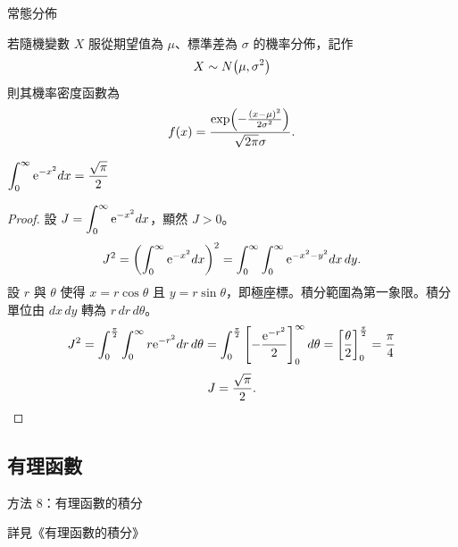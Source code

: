 \documentclass{beamer}
\newcommand{\Left} {\mathopen{}\mathclose\bgroup\left}
\newcommand{\Right}{\aftergroup\egroup\right}
\newcommand{\e}{\textup e}
\newcommand{\erf} {\operatorname{erf}}
\newcommand{\negskip}{\vskip -2em plus 3pt minus 3pt}
\theoremstyle{remark}
\begin{document}
\begin{frame}{常態分佈}
  \begin{definition}
    若隨機變數 $X$ 服從期望值為 $\mu$、標準差為 $\sigma$ 的機率分佈，記作
    \[X \sim N \Left( \mu, \sigma^2 \Right)\]
    則其機率密度函數為
    \[f(x) = \frac{\exp \Left( -\frac{\left( x - \mu \right)^2}{2\sigma^2} \Right)}{\sqrt{2\pi} \sigma}.\]
  \end{definition}
\end{frame}


\begin{frame}{$\displaystyle \int_0^\infty \e^{-x^2} dx = \frac{\sqrt\pi}{2}$}
  \begin{proof}
    設 $\displaystyle J = \int_0^\infty \e^{-x^2} dx$，顯然 $J > 0$。
    \[J^2 = \left( \int_0^\infty \e^{-x^2} dx \right)^2 = \int_0^\infty \int_0^\infty \e^{-x^2-y^2} dx\,dy.\]
    設 $r$ 與 $\theta$ 使得 $x = r\cos\theta$ 且 $y = r\sin\theta$，即極座標。積分範圍為第一象限。積分單位由 $dx\,dy$ 轉為
    $r\,dr\,d\theta$。
    \[J^2 = \int_0^{\frac\pi2} \int_0^\infty r \e^{-r^2} dr\,d\theta
	= \int_0^{\frac\pi2} \left[ -\frac{\e^{-r^2}}{2} \right]_0^\infty d\theta
	= \left[ \frac\theta2 \right]_0^{\frac\pi2}
	= \frac\pi4\]
    \[J = \frac{\sqrt\pi}{2}.\qedhere\]
  \end{proof}
\end{frame}

\subsection{有理函數}
\begin{frame}{方法 8：有理函數的積分}
  \centerline{詳見《有理函數的積分》}
\end{frame}
\end{document}
